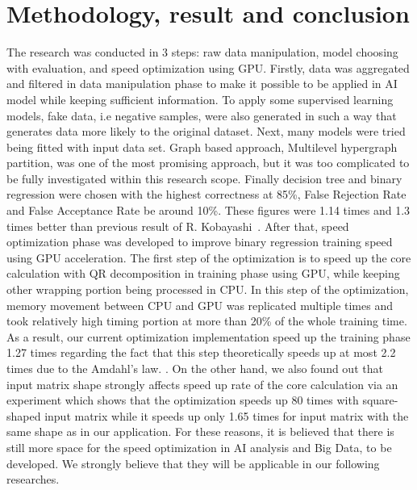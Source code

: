 \documentclass[English]{dicomopapers}
\begin{document}
\section{Methodology, result and conclusion}
The research was conducted in 3 steps: raw data manipulation, model choosing with evaluation, and speed optimization using GPU. Firstly, data was aggregated and filtered in data manipulation phase to make it possible to be applied in AI model while keeping sufficient information. To apply some supervised learning models, fake data, i.e negative samples, were also generated in such a way that generates data more likely to the original dataset. Next, many models were tried being fitted with input data set. Graph based approach, Multilevel hypergraph partition, was one of the most promising approach, but it was too complicated to be fully investigated within this research scope. Finally decision tree and binary regression were chosen with the highest correctness at 85\%, False Rejection Rate and False Acceptance Rate be around 10\%. These figures were 1.14 times and 1.3 times better than previous result of R. Kobayashi~\cite{kobayashi1}. After that, speed optimization phase was developed to improve binary regression training speed using GPU acceleration. The first step of the optimization is to speed up the core calculation with QR decomposition in training phase using GPU, while keeping other wrapping portion being processed in CPU. In this step of the optimization, memory movement between CPU and GPU was replicated multiple times and took relatively high timing portion at more than 20\% of the whole training time. As a result, our current optimization implementation speed up the training phase 1.27 times regarding the fact that this step theoretically speeds up at most 2.2 times due to the Amdahl’s law.
. On the other hand, we also found out that input matrix shape strongly affects speed up rate of the core calculation via an experiment which shows that the optimization speeds up 80 times with square-shaped input matrix while it speeds up only 1.65 times for input matrix with the same shape as in our application. For these reasons, it is believed that there is still more space for the speed optimization in AI analysis and Big Data, to be developed. We strongly believe that they will be applicable in our following researches.



\end{document}
